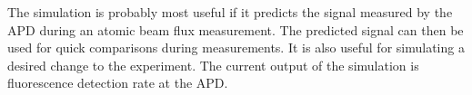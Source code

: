 \documentclass[12pt, a4paper]{article}
\begin{document}
The simulation is probably most useful if it predicts the signal measured by the APD during an atomic beam flux measurement. The predicted signal can then be used for quick comparisons during measurements. It is also useful for simulating a desired change to the experiment. The current output of the simulation is fluorescence detection rate at the APD.


\nocite{*}
{}

\end{document}
